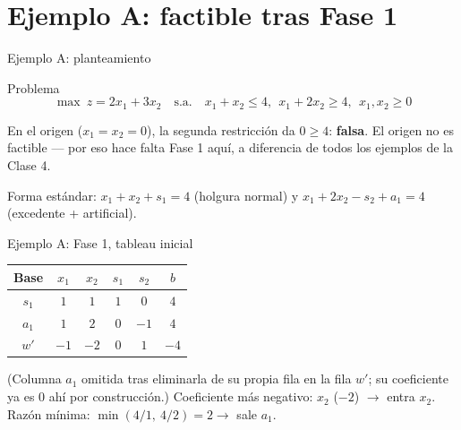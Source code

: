 \documentclass[aspectratio=169]{beamer}
\begin{document}
\section{Ejemplo A: factible tras Fase 1}

\begin{frame}{Ejemplo A: planteamiento}
\begin{block}{Problema}
\[
\max\ z=2x_1+3x_2 \quad\text{s.a.}\quad x_1+x_2\leq4,\ \ x_1+2x_2\geq4,\ \ x_1,x_2\geq0
\]
\end{block}

En el origen ($x_1=x_2=0$), la segunda restricción da $0\geq4$: \textbf{falsa}. El origen no es factible --- por eso hace falta Fase 1 aquí, a diferencia de todos los ejemplos de la Clase 4.

Forma estándar: $x_1+x_2+s_1=4$ (holgura normal) y $x_1+2x_2-s_2+a_1=4$ (excedente + artificial).
\end{frame}

\begin{frame}{Ejemplo A: Fase 1, tableau inicial}
\begin{center}
\renewcommand{\arraystretch}{1.25}
\begin{tabular}{c|cccc|c}
\textbf{Base} & $x_1$ & $x_2$ & $s_1$ & $s_2$ & $b$ \\
\hline
$s_1$ & $1$ & $1$ & $1$ & $0$ & $4$ \\
$a_1$ & $1$ & $2$ & $0$ & $-1$ & $4$ \\
\hline
$w'$ & $-1$ & \cellcolor{entra!20}$-2$ & $0$ & $1$ & $-4$ \\
\end{tabular}
\end{center}

\vspace{0.2cm}
(Columna $a_1$ omitida tras eliminarla de su propia fila en la fila $w'$; su coeficiente ya es $0$ ahí por construcción.) Coeficiente más negativo: $x_2$ ($-2$) $\to$ entra $x_2$. Razón mínima: $\min(4/1,\ 4/2)=2\to$ sale $a_1$.
\end{frame}
\end{document}
